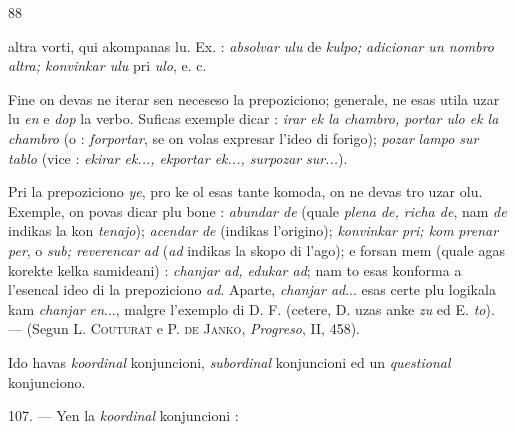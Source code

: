 \begin{VUpage}[92]{88}

\VUcontinue
altra vorti, qui akompanas lu. Ex. : \textit{absolvar ulu} de \textit{kulpo;}\nl
\textit{adicionar un nombro}  \textit{altra; konvinkar ulu} pri \textit{ulo}, e. c.

Fine on devas ne iterar sen neceseso la prepoziciono;\nl
generale, ne esas utila uzar lu \textit{en} e \textit{dop} la verbo. Suficas\nl
exemple dicar : \textit{irar ek la chambro, portar ulo ek la chambro}\nl
(o : \textit{forportar}, se on volas expresar l'ideo di forigo); \textit{pozar}\nl
\textit{lampo sur tablo} (vice : \textit{ekirar ek..., ekportar ek..., surpozar}\nl
\textit{sur...}).

Pri la prepoziciono \textit{ye}, pro ke ol esas tante komoda, on\nl
ne devas tro uzar olu. Exemple, on povas dicar plu bone :\nl
\textit{abundar de} (quale \textit{plena de, richa de}, nam \textit{de} indikas la kon\cc
\textit{tenajo}); \textit{acendar de} (indikas l'origino); \textit{konvinkar pri; kom}\cc
\textit{prenar per}, o \textit{sub; reverencar ad} (\textit{ad} indikas la skopo di\nl
l'ago); e forsan mem (quale agas korekte kelka samideani) :\nl
\textit{chanjar ad, edukar ad}; nam to esas konforma a l'esencal ideo\nl
di la prepoziciono \textit{ad}. Aparte, \textit{chanjar ad}... esas certe plu\nl
logikala kam \textit{chanjar en}..., malgre l'exemplo di D. F. (cetere,\nl
D. uzas anke \textit{zu} ed E. \textit{to}). --- (Segun L. \textsc{Couturat} e P. \textsc{de}\nl
\textsc{Janko}, \textit{Progreso}, II, 458).

\VUsaut{6.23mm}
\VUsaut{4.17mm}

Ido havas \textit{koordinal} konjuncioni, \textit{subordinal} konjuncioni\nl
ed un \textit{questional} konjunciono.

\VUblanc{5.83pt}%
107. --- Yen la \textit{koordinal} konjuncioni :


\end{VUpage}
